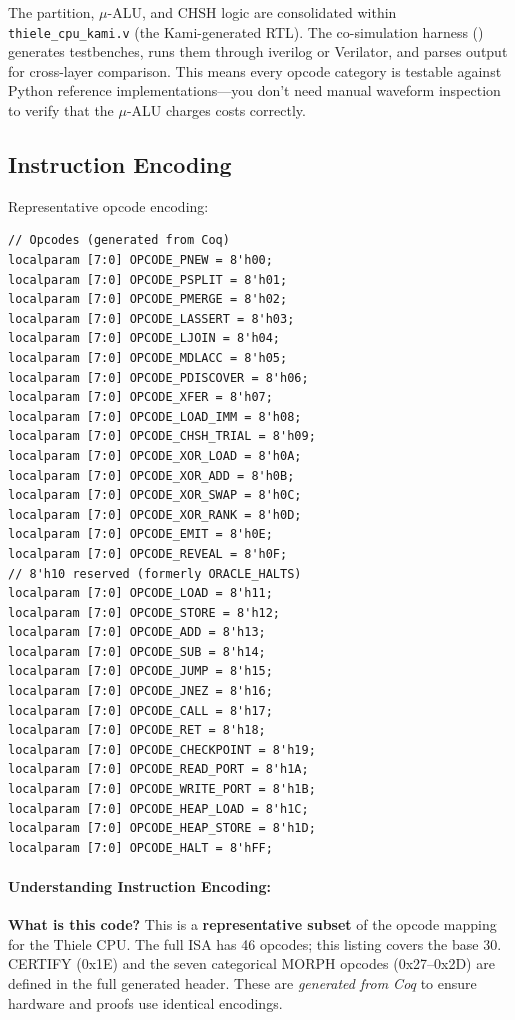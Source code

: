 The partition, $\mu$-ALU, and CHSH logic are consolidated within \texttt{thiele\_cpu\_kami.v} (the Kami-generated RTL). The co-simulation harness () generates testbenches, runs them through iverilog or Verilator, and parses output for cross-layer comparison. This means every opcode category is testable against Python reference implementations---you don't need manual waveform inspection to verify that the $\mu$-ALU charges costs correctly.

\subsection{Instruction Encoding}

Representative opcode encoding:
\begin{lstlisting}
// Opcodes (generated from Coq)
localparam [7:0] OPCODE_PNEW = 8'h00;
localparam [7:0] OPCODE_PSPLIT = 8'h01;
localparam [7:0] OPCODE_PMERGE = 8'h02;
localparam [7:0] OPCODE_LASSERT = 8'h03;
localparam [7:0] OPCODE_LJOIN = 8'h04;
localparam [7:0] OPCODE_MDLACC = 8'h05;
localparam [7:0] OPCODE_PDISCOVER = 8'h06;
localparam [7:0] OPCODE_XFER = 8'h07;
localparam [7:0] OPCODE_LOAD_IMM = 8'h08;
localparam [7:0] OPCODE_CHSH_TRIAL = 8'h09;
localparam [7:0] OPCODE_XOR_LOAD = 8'h0A;
localparam [7:0] OPCODE_XOR_ADD = 8'h0B;
localparam [7:0] OPCODE_XOR_SWAP = 8'h0C;
localparam [7:0] OPCODE_XOR_RANK = 8'h0D;
localparam [7:0] OPCODE_EMIT = 8'h0E;
localparam [7:0] OPCODE_REVEAL = 8'h0F;
// 8'h10 reserved (formerly ORACLE_HALTS)
localparam [7:0] OPCODE_LOAD = 8'h11;
localparam [7:0] OPCODE_STORE = 8'h12;
localparam [7:0] OPCODE_ADD = 8'h13;
localparam [7:0] OPCODE_SUB = 8'h14;
localparam [7:0] OPCODE_JUMP = 8'h15;
localparam [7:0] OPCODE_JNEZ = 8'h16;
localparam [7:0] OPCODE_CALL = 8'h17;
localparam [7:0] OPCODE_RET = 8'h18;
localparam [7:0] OPCODE_CHECKPOINT = 8'h19;
localparam [7:0] OPCODE_READ_PORT = 8'h1A;
localparam [7:0] OPCODE_WRITE_PORT = 8'h1B;
localparam [7:0] OPCODE_HEAP_LOAD = 8'h1C;
localparam [7:0] OPCODE_HEAP_STORE = 8'h1D;
localparam [7:0] OPCODE_HALT = 8'hFF;
\end{lstlisting}

\paragraph{Understanding Instruction Encoding:}

\textbf{What is this code?} This is a \textbf{representative subset} of the opcode mapping for the Thiele CPU. The full ISA has 46 opcodes; this listing covers the base 30. CERTIFY (0x1E) and the seven categorical MORPH opcodes (0x27–0x2D) are defined in the full generated header. These are \textit{generated from Coq} to ensure hardware and proofs use identical encodings.

